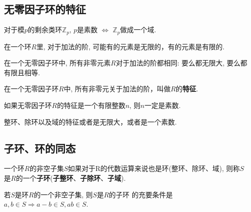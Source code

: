 \subsection{无零因子环的特征}  %

\begin{Proposition}
对于模$p$的剩余类环$\mathbb{Z}_p$, $p$是素数 $\Leftrightarrow $ $\mathbb{Z}_p$做成一个域.
\end{Proposition}

\begin{Proposition}
在一个环$R$里, 对于加法的阶, 可能有的元素是无限的，有的元素是有限的.
\end{Proposition}

\begin{Theorem}
在一个无零因子环中, 所有非零元素$R$对于加法的阶都相同: 要么都无限大, 要么都有限且相等.
\end{Theorem}

\begin{Definition}[无零因子环的特征]
在一个无零因子环$R$中, 所有非零元关于加法的阶，叫做$R$的\textbf{特征}.
\end{Definition}

\begin{Theorem}
如果无零因子环$R$的特征是一个有限整数$n$, 则$n$一定是素数.
\end{Theorem}

\begin{Corollary}
整环、除环以及域的特征或者是无限大，或者是一个素数.
\end{Corollary}


\subsection{子环、环的同态} %

\begin{Definition}[子环]
一个环$R$的非空子集$S$如果对于R的代数运算来说也是环(整环、除环、域), 则称$S$是$R$的一个\textbf{子环}(\textbf{子整环}、\textbf{子除环}、\textbf{子域}).
\end{Definition}

\begin{Theorem}
若$S$是环$R$的一个非空子集, 则$S$是$R$的子环 的充要条件是 $a, b \in S \Rightarrow a-b \in S, ab \in S$.
\end{Theorem}

